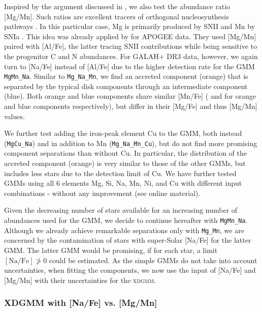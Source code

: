 \documentclass[fleqn,usenatbib]{mnras}
\begin{document}
Inspired by the argument discussed in \citet{Hawkins2015}, we also test the abundance ratio [Mg/Mn]. Such ratios are excellent tracers of orthogonal nucleosynthesis pathways \citep[e.g.][]{Ting2012, Ting2015}. In this particular case, Mg is primarily produced by SNII \citep{Nomoto2013} and Mn by SNIa \citep{Gratton1989}. This idea was already applied by \citet{Das2020} for APOGEE data. They used [Mg/Mn] paired with [Al/Fe], the latter tracing SNII contributions while being sensitive to the progenitor C and N abundances. For GALAH+ DR3 data, however, we again turn to [Na/Fe] instead of [Al/Fe] due to the higher detection rate for the GMM \texttt{MgMn\_Na}. Similar to \texttt{Mg\_Na\_Mn}, we find an accreted component (orange) that is separated by the typical disk components through an intermediate component (blue). Both orange and blue components share similar [Mn/Fe] ( and  for orange and blue components respectively), but differ in their [Mg/Fe] and thus [Mg/Mn] values.

We further test adding the iron-peak element Cu to the GMM, both instead (\texttt{MgCu\_Na}) and in addition to Mn (\texttt{Mg\_Na\_Mn\_Cu}), but do not find more promising component separations than without Cu. In particular, the distribution of the accreted component (orange) is very similar to those of the other GMMs, but includes less stars due to the detection limit of Cu. We have further tested GMMs using all 6 elements Mg, Si, Na, Mn, Ni, and Cu with different input combinations - without any improvement (see online material).

Given the decreasing number of stars available for an increasing number of abundances used for the GMM, we decide to continue hereafter with \texttt{MgMn\_Na}. Although we already achieve remarkable separations only with \texttt{Mg\_Mn}, we are concerned by the contamination of stars with super-Solar [Na/Fe] for the latter GMM. The latter GMM would be promising, if for each star, a limit $\mathrm{[Na/Fe]} \ngtr 0$ could be estimated. As the simple GMMs do not take into account uncertainties, when fitting the components, we now use the input of [Na/Fe] and [Mg/Mn] with their uncertainties for the \textsc{xdgmm}.

\subsubsection{XDGMM with [Na/Fe] vs. [Mg/Mn]} \label{sec:xdgmm_MgMn_Na} \label{sec:xdgmm_selection}
\end{document}
